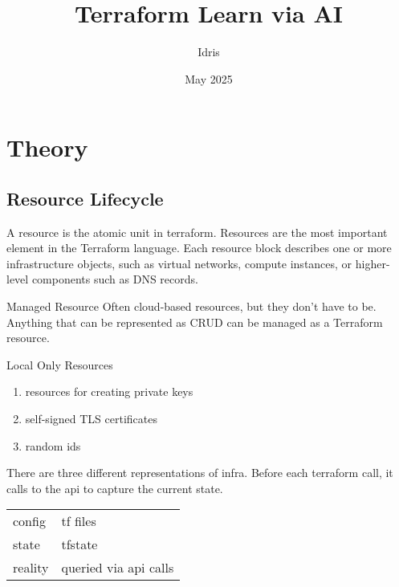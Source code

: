 \documentclass[openany, 12pt]{book}
\title{Terraform Learn via AI}
\author{Idris}
\date{May 2025}
\begin{document}
\tableofcontents

\part{Theory}
\chapter{Resource Lifecycle}
A resource is the atomic unit in terraform. Resources are the most important
element in the Terraform language. Each resource block describes one or more
infrastructure objects, such as virtual networks, compute instances, or
higher-level components such as DNS records.

\begin{definition}{Managed Resource}{}
	Often cloud-based resources, but they don’t have to be. Anything that can be
	represented as CRUD can be managed as a Terraform resource.
\end{definition}

\begin{example}{Local Only Resources}{}
	\begin{enumerate}[label = {(\arabic*)}]
		\item resources for creating private keys
		\item self-signed TLS certificates
		\item random ids
	\end{enumerate}
\end{example}

There are three different representations of infra. Before each terraform call,
it calls to the api to capture the current state.

\begin{center}
	\begin{tabular}{ll}
		\toprule
		        &                       \\
		\midrule
		config  & tf files              \\
		state   & tfstate               \\
		reality & queried via api calls \\
		\bottomrule
	\end{tabular}
\end{center}
\end{document}

